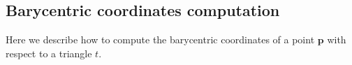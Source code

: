 \chapter{}
\section{Barycentric coordinates computation}
\label{app:barycentric_}
Here we describe how to compute the barycentric coordinates of a point $\mathbf{p}$ with respect to a triangle $t$.





% 
% 
% 
% 
% 
